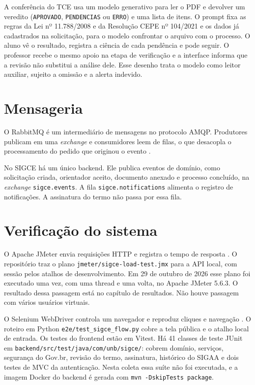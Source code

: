 A conferência do TCE usa um modelo generativo para ler o PDF e devolver um veredito (\texttt{APROVADO}, \texttt{PENDENCIAS} ou \texttt{ERRO}) e uma lista de itens. O prompt fixa as regras da Lei nº 11.788/2008 e da Resolução CEPE nº 104/2021 e os dados já cadastrados na solicitação, para o modelo confrontar o arquivo com o processo. O aluno vê o resultado, registra a ciência de cada pendência e pode seguir. O professor recebe o mesmo apoio na etapa de verificação e a interface informa que a revisão não substitui a análise dele. Esse desenho trata o modelo como leitor auxiliar, sujeito a omissão e a alerta indevido.

\section{Mensageria}

O RabbitMQ é um intermediário de mensagens no protocolo AMQP. Produtores publicam em uma \textit{exchange} e consumidores leem de filas, o que desacopla o processamento do pedido que originou o evento \cite{rabbitmq_doc}.

No SIGCE há um único backend. Ele publica eventos de domínio, como solicitação criada, orientador aceito, documento anexado e processo concluído, na \textit{exchange} \texttt{sigce.events}. A fila \texttt{sigce.notifications} alimenta o registro de notificações. A assinatura do termo não passa por essa fila.

\section{Verificação do sistema}

O Apache JMeter envia requisições HTTP e registra o tempo de resposta \cite{jmeter_doc}. O repositório traz o plano \texttt{jmeter/\allowbreak sigce-load-test.jmx} para a API local, com sessão pelos atalhos de desenvolvimento. Em 29 de outubro de 2026 esse plano foi executado uma vez, com uma thread e uma volta, no Apache JMeter 5.6.3. O resultado dessa passagem está no capítulo de resultados. Não houve passagem com vários usuários virtuais.

O Selenium WebDriver controla um navegador e reproduz cliques e navegação \cite{selenium_doc}. O roteiro em Python \texttt{e2e/\allowbreak test\_sigce\_flow.py} cobre a tela pública e o atalho local de entrada. Os testes do frontend estão em Vitest. Há 41 classes de teste JUnit em \texttt{backend/\allowbreak src/\allowbreak test/\allowbreak java/\allowbreak com/\allowbreak unb/\allowbreak sigce/}: cobrem domínio, serviços, segurança do Gov.br, revisão do termo, assinatura, histórico do SIGAA e dois testes de MVC da autenticação. Nesta coleta essa suíte não foi executada, e a imagem Docker do backend é gerada com \texttt{mvn -DskipTests package}.
